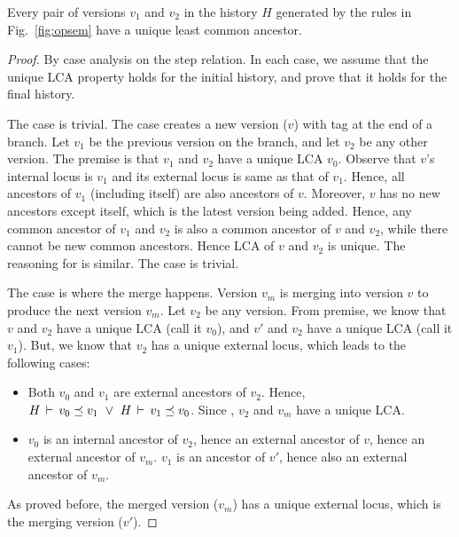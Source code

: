 \begin{theorem} 
Every pair of versions $v_1$ and $v_2$ in the history $H$ generated by
the rules in Fig.~\ref{fig:opsem} have a unique least
common ancestor. 
\end{theorem}
\begin{proof}
By case analysis on the step relation. In each case, we assume that
the unique LCA property holds for the initial history, and prove that
it holds for the final history.

The  case is trivial. The  case
creates a new version ($v$) with  tag at the end of a branch.
Let $v_1$ be the previous version on the branch, and let $v_2$ be any
other version. The premise is that $v_1$ and $v_2$ have a unique LCA
$v_0$. Observe that $v$'s internal locus is $v_1$ and its external
locus is same as that of $v_1$. Hence, all ancestors of $v_1$
(including itself) are also ancestors of $v$. Moreover, $v$ has no new
ancestors except itself, which is the latest version being added.
Hence, any common ancestor of $v_1$ and $v_2$ is also a common
ancestor of $v$ and $v_2$, while there cannot be new common ancestors.
Hence LCA of $v$ and $v_2$ is unique. The reasoning for
 is similar. The  case is trivial. 

The  case is where the merge happens. Version
$v_m$ is merging into version $v$ to produce the next version $v_m$.
Let $v_2$ be any version. From premise, we know that $v$ and $v_2$
have a unique LCA (call it $v_0$), and $v'$ and $v_2$ have a unique
LCA (call it $v_1$). But, we know that $v_2$ has a unique external
locus, which leads to the following cases:
\begin{itemize}
  \item Both $v_0$ and $v_1$ are external ancestors of $v_2$. Hence,
  $H\,\vdash\,v_0 \preceq v_1 ~\vee~ H\,\vdash\,v_1 \preceq v_0$.
  Since \disj {}, 
  $v_2$ and $v_m$ have a unique LCA.

  \item $v_0$ is an internal ancestor of $v_2$, hence an external
  ancestor of $v$, hence an external ancestor of $v_m$. $v_1$ is
  an ancestor of $v'$, hence also an external ancestor of $v_m$. 
\end{itemize}


As proved
before, the merged version ($v_m$) has a unique external locus, which
is the merging version ($v'$).
\end{proof}

